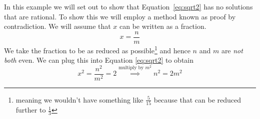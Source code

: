 \begin{example}\label{ex:gaps}
In this example we will set out to show that Equation~\ref{eq:sqrt2} has no
solutions that are rational. To show this we will employ a method known as
proof by contradiction. We will assume that $x$ can be written as a fraction.
\begin{equation}\label{eq:sqrt2-is-rational}
    x = \frac{n}{m}
\end{equation}
We take the fraction to be as reduced as possible\footnote{meaning we
wouldn't have something like $\frac{5}{15}$ because that can be reduced further
to $\frac{1}{3}$} and hence $n$ and $m$ are \emph{not both} even. We can plug
this into Equation \ref{eq:sqrt2} to obtain
\begin{equation*}
x^2 = \frac{n^2}{m^2} = 2 \overset{\text{multiply by } m^2}{\implies} n^2 =
2m^2
\end{equation*}
\end{example}

